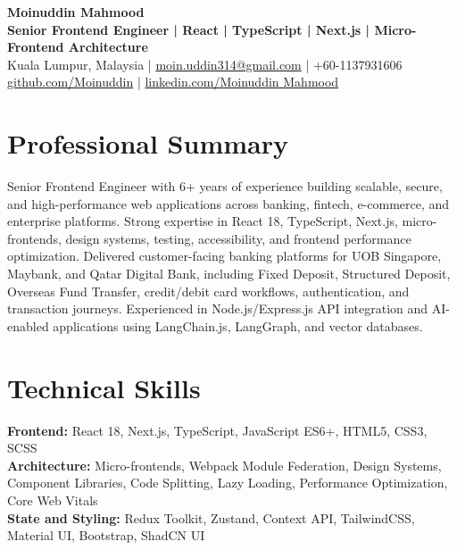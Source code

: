 \documentclass[10pt,a4paper]{article}
\begin{document}
\begin{center}
    {\Huge \textbf{Moinuddin Mahmood}} \\
    \vspace{3pt}
    \textbf{Senior Frontend Engineer | React | TypeScript | Next.js | Micro-Frontend Architecture} \\
    \vspace{5pt}
    Kuala Lumpur, Malaysia \quad | \quad
    \href{mailto:moin.uddin314@gmail.com}{moin.uddin314@gmail.com} \quad | \quad
    +60-1137931606 \\
    \href{https://github.com/moynuddin}{github.com/Moinuddin}
    \quad | \quad
    \href{https://linkedin.com/in/moyn-uddin}{linkedin.com/Moinuddin Mahmood}
\end{center}

\section*{Professional Summary}

Senior Frontend Engineer with 6+ years of experience building scalable, secure, and high-performance web applications across banking, fintech, e-commerce, and enterprise platforms. Strong expertise in React 18, TypeScript, Next.js, micro-frontends, design systems, testing, accessibility, and frontend performance optimization. Delivered customer-facing banking platforms for UOB Singapore, Maybank, and Qatar Digital Bank, including Fixed Deposit, Structured Deposit, Overseas Fund Transfer, credit/debit card workflows, authentication, and transaction journeys. Experienced in Node.js/Express.js API integration and AI-enabled applications using LangChain.js, LangGraph, and vector databases.

\section*{Technical Skills}

\textbf{Frontend:} React 18, Next.js, TypeScript, JavaScript ES6+, HTML5, CSS3, SCSS \\

\textbf{Architecture:} Micro-frontends, Webpack Module Federation, Design Systems, Component Libraries, Code Splitting, Lazy Loading, Performance Optimization, Core Web Vitals \\

\textbf{State and Styling:} Redux Toolkit, Zustand, Context API, TailwindCSS, Material UI, Bootstrap, ShadCN UI \\
\end{document}
